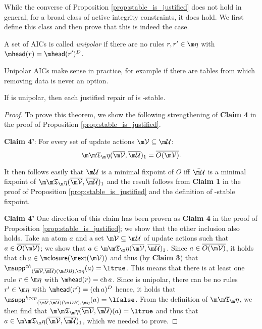 While the converse of Proposition \ref{prop:stable_is_justified} does not hold in general, for a broad class of active integrity constraints, it does hold. We first define this class and then prove that this is indeed the case. 

\begin{definition}
 A set of AICs \aics is called \emph{unipolar} if there are no rules $r,r'\in\aics$ with $\head(r)=\head(r')^D$. 
\end{definition}

Unipolar AICs make sense in practice, for example if there are tables from which removing data is never an option.


\begin{proposition}\label{prop:justified_is_stable_sometimes}
If \aics is unipolar, then each justified repair of \fulldb is \Ap-stable. 
\end{proposition}
\begin{proof}
 To prove this theorem, we show the following strengthening of \textbf{Claim 4} in the proof of Proposition \ref{prop:stable_is_justified}. 
 \begin{compactdesc}
  \item \textbf{Claim 4'}: For every set of update actions $\VV\subseteq \UU$: 
 \[\Ap(\overline\VV,\overline\UU)_1= \overline{O(\VV)}.\] 
\end{compactdesc}
 It then follows easily that $\UU$ is a minimal fixpoint of $O$ iff $\bar\UU$ is a minimal fixpoint of $\Ap(\overline\VV,\overline\UU)_1$ and the result follows from \textbf{Claim 1} in the proof of Proposition \ref{prop:stable_is_justified} and the definition of \Ap-stable fixpoint. 
 
\textbf{Claim 4'}
One direction of this claim has been proven as \textbf{Claim 4} in the proof of Proposition \ref{prop:stable_is_justified}; we show that the other inclusion also holds.
 Take an atom $a$ and a set $\VV\subseteq\UU$ of update actions such that $a\in \overline{O(\VV)}$; we show that $a\in\Ap(\overline\VV,\overline\UU)_1$. Since $a\in\overline{O(\VV)}$, it holds that $\change a\in \closure(\ext(\VV))$ and thus (by \textbf{Claim 3}) that $\suppin_{(\overline\VV,\overline\UU)(\db),\aics}(a)=\ltrue$. This means that there is at least one rule $r\in\aics$ with $\head(r)=\change a$. Since \aics is unipolar, there can be no rules $r'\in\aics$ with $\head(r') = (\change a)^D$ hence, it holds that $\suppout_{(\overline\VV,\overline\UU)(\db),\aics}(a)=\lfalse$. From the definition of $\Ap$, we then find that $\Ap(\overline\VV,\overline\UU)(a)=\ltrue$ and thus that  $a\in \Ap(\overline\VV,\overline\UU)_1$, which we needed to prove. 
\qedhere
\end{proof}

